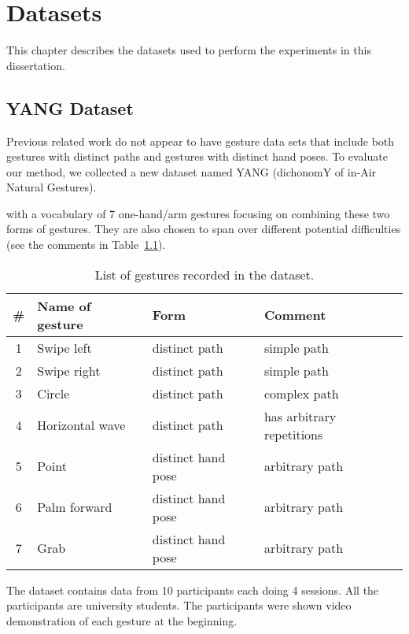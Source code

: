 \chapter{Datasets}

This chapter describes the datasets used to perform the experiments in this
dissertation.

\section{YANG Dataset}
Previous related work do not appear to have gesture data sets
that include both gestures with distinct paths and gestures with distinct hand
poses. To evaluate our method, we collected a new dataset named YANG (dichonomY
of in-Air Natural Gestures).

with a vocabulary of 7
one-hand/arm gestures focusing on combining these two forms of gestures. They
are also chosen to span over different potential difficulties (see the comments in Table~\ref{tab:gestures}).

\begin{table}
\caption{List of gestures recorded in the dataset.}
\label{tab:gestures}
\centering
\begin{tabular}{|c|l|l|l|}
\hline
\# & Name of gesture & Form & Comment \\
\hline
1 & Swipe left & distinct path & simple path \\
\hline
2 & Swipe right & distinct path & simple path \\
\hline
3 & Circle & distinct path & complex path \\
\hline
4 & Horizontal wave & distinct path & has arbitrary repetitions \\
\hline
5 & Point & distinct hand pose & arbitrary path \\
\hline
6 & Palm forward & distinct hand pose & arbitrary path \\
\hline
7 & Grab & distinct hand pose & arbitrary path \\
\hline
\end{tabular}
\end{table}

The dataset contains data from 10 participants each
doing 4 sessions. All the participants are university students.
The participants were shown video demonstration of each gesture at the beginning. 

